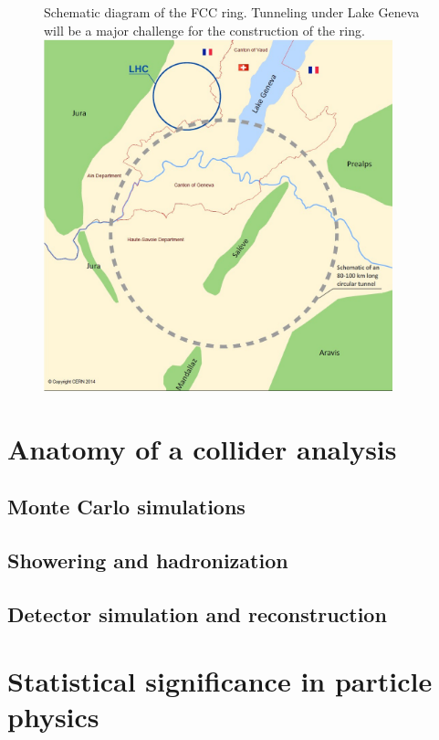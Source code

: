 \begin{figure}[h]
  \begin{sidecaption}
    {Schematic diagram of the FCC ring. Tunneling under Lake Geneva will be a major challenge for the construction of the ring.}
    \centering
  \includegraphics[width=0.9\textwidth]{images/FCC_ring_schematic}
  \end{sidecaption}
\end{figure}
\section{Anatomy of a collider analysis}
\subsection{Monte Carlo simulations}
\subsection{Showering and hadronization}
\subsection{Detector simulation and reconstruction}
\section{Statistical significance in particle physics}
